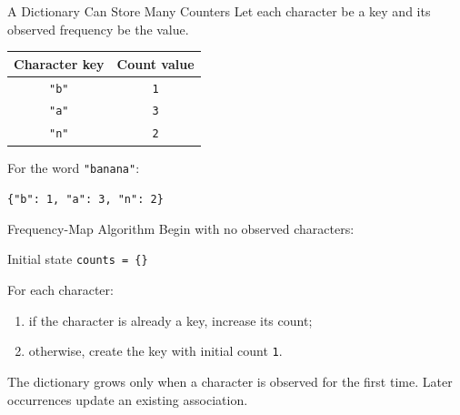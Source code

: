 \documentclass[aspectratio=169,10pt]{beamer}
\begin{document}
\begin{frame}{A Dictionary Can Store Many Counters}
  Let each character be a key and its observed frequency be the value.

  \begin{center}
    \renewcommand{\arraystretch}{1.25}
    \begin{tabular}{c|c}
      \textbf{Character key} & \textbf{Count value} \\\hline
      \texttt{"b"} & \texttt{1} \\
      \texttt{"a"} & \texttt{3} \\
      \texttt{"n"} & \texttt{2}
    \end{tabular}
  \end{center}

  For the word \texttt{"banana"}:

  \begin{center}
    \texttt{\{"b": 1, "a": 3, "n": 2\}}
  \end{center}
\end{frame}

\begin{frame}{Frequency-Map Algorithm}
  Begin with no observed characters:

  \begin{block}{Initial state}
    \texttt{counts = \{\}}
  \end{block}

  For each character:

  \begin{enumerate}
    \item if the character is already a key, increase its count;
    \item otherwise, create the key with initial count \texttt{1}.
  \end{enumerate}

  \begin{keyidea}
    The dictionary grows only when a character is observed for the first time. Later occurrences update an existing association.
  \end{keyidea}
\end{frame}
\end{document}
